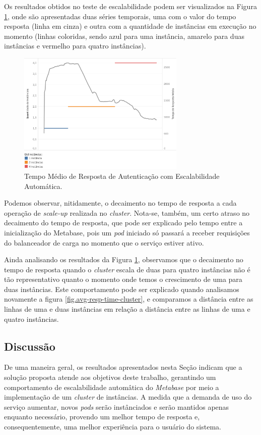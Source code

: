 Os resultados obtidos no teste de escalabilidade podem ser visualizados na Figura \ref{fig.avg-resp-time-hpa}, onde são apresentadas duas séries temporais, uma com o valor do tempo resposta (linha em cinza) e outra com a quantidade de instâncias em execução no momento (linhas coloridas, sendo azul para uma instância, amarelo para duas instâncias e vermelho para quatro instâncias).

\begin{figure}[htp]
   \centering
    \includegraphics[width=8cm]{Imagens/Performance-HPA}
    \caption{Tempo Médio de Resposta de Autenticação com Escalabilidade Automática.}
    \label{fig.avg-resp-time-hpa}
\end{figure} 

Podemos observar, nitidamente, o decaimento no tempo de resposta a cada operação de \textit{scale-up} realizada no \textit{cluster}. Nota-se, também, um certo atraso no decaimento do tempo de resposta, que pode ser explicado pelo tempo entre a inicialização do Metabase, pois um \textit{pod} iniciado só passará a receber requisições do balanceador de carga no momento que o serviço estiver ativo.

Ainda analisando os resultados da Figura \ref{fig.avg-resp-time-hpa}, observamos que o decaimento no tempo de resposta quando o \textit{cluster} escala de duas para quatro instâncias não é tão representativo quanto o momento onde temos o crescimento de uma para duas instâncias. Este comportamento pode ser explicado quando analisamos novamente a figura \ref{fig.avg-resp-time-cluster}, e comparamos a distância entre as linhas de uma e duas instâncias em relação a distância entre as linhas de uma e quatro instâncias.


\subsection{Discussão}

De uma maneira geral, os resultados apresentados nesta Seção indicam que a solução proposta atende aos objetivos deste trabalho, gerantindo um comportamento de escalabilidade automâtica do \textit{Metabase} por meio a implementação de um \textit{cluster} de instâncias. A medida que a demanda de uso do serviço aumentar, novos \textit{pods} serão instânciados e serão mantidos apenas enquanto necessário, provendo um melhor tempo de resposta e, consequentemente, uma melhor experiência para o usuário do sistema. 

